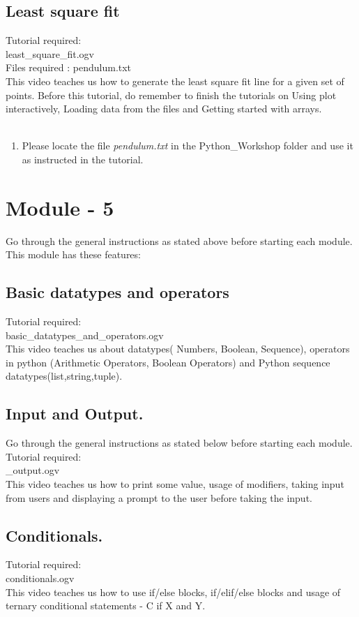 \documentclass[11pt,twocolumn]{article}
\newenvironment{enumcpt}{\begin{enumerate} \topsep 0pt \partopsep 0pt 
                        \parsep 0pt
                        \itemsep 0pt \leftmargin -1in \rightmargin 0pt
                        }{\end{enumerate}}
\begin{document}
\subsection{Least square fit}
Tutorial required: \\least\_square\_fit.ogv \\
Files required : pendulum.txt \\
This video teaches us how to generate the least square fit line for a given set of points. Before this tutorial, do remember to finish the tutorials on Using plot interactively, Loading data from the files and Getting started with arrays. \\ \\
\begin{enumcpt}
\item Please locate the file \emph{pendulum.txt} in the Python\_Workshop folder and use it
      as instructed in the tutorial. 
\end{enumcpt}

\section{Module - 5}
Go through the general instructions as stated above before starting each module.
This module has these features:
\subsection{Basic datatypes and operators}
Tutorial required: \\basic\_datatypes\_and\_operators.ogv \\
This video teaches us about datatypes( Numbers, Boolean, Sequence), operators in python (Arithmetic Operators, Boolean Operators) and Python sequence datatypes(list,string,tuple).

\subsection{Input and Output.}
Go through the general instructions as stated below before starting each module.
Tutorial required: \\_output.ogv \\

This video teaches us how to print some value, usage of modifiers, taking input from users and displaying a prompt to the user before taking the input. 
\subsection{Conditionals.}
Tutorial required: \\ conditionals.ogv \\
This video teaches us how to use if/else blocks, if/elif/else blocks and usage of ternary conditional statements - C if X and Y.
\end{document}
